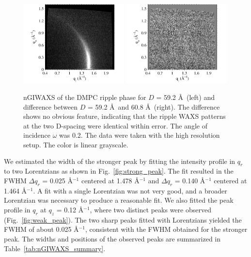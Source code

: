 \begin{figure}[htbp]
  \centering
  \includegraphics[width=0.49\textwidth]{figures/ripple/nGIWAXS/dmpc1_046}
  \includegraphics[width=0.49\textwidth]{figures/ripple/nGIWAXS/046_vs_052}
  \caption{nGIWAXS of the DMPC ripple phase for $D$ = 59.2 \AA\ (left)
  and difference between $D$ = 59.2 \AA\ and 60.8 \AA\ (right). 
  The difference shows no obvious feature, indicating that the ripple WAXS
  patterns at the two D-spacing were identical within error.
  The angle of incidence $\omega$ was 0.2\textdegree. The data were taken
  with the high resolution setup. The color is linear grayscale.}
  \label{fig:nGIWAXS}
\end{figure}

We estimated the width of the stronger peak by fitting 
the intensity profile in $q_r$ to two Lorentzians as shown in 
Fig.~\ref{fig:strong_peak}. The fit resulted in the FWHM $\Delta q_r$
= 0.025 \AA$^{-1}$ centered at 1.478 \AA$^{-1}$ and 
$\Delta q_r$ = 0.140 \AA$^{-1}$ centered at 1.464 \AA$^{-1}$.
A fit with a single Lorentzian was not very good, and 
a broader Lorentzian was necessary to produce a reasonable fit. 
We also fitted the peak profile in $q_r$ at $q_z$ = 0.12 \AA$^{-1}$,
where two distinct peaks were observed (Fig.~\ref{fig:weak_peak}).
The two sharp peaks fitted with Lorentzians yielded the FWHM of about 
0.025 \AA$^{-1}$, consistent with the FWHM obtained for the stronger 
peak. The widths and positions of the observed peaks are summarized
in Table~\ref{tab:nGIWAXS_summary}.

